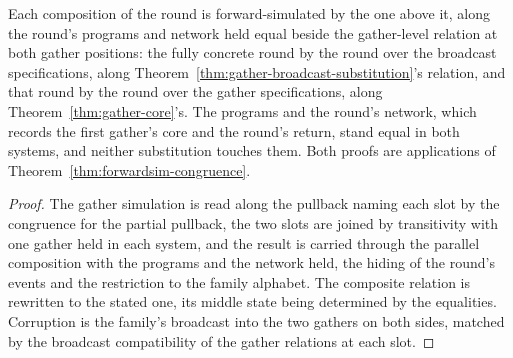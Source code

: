\begin{theorem}
  \label{thm:gbca-round-substitutions}
  \leanok
  Each composition of the round is forward-simulated by the one above it, along the round's programs and network held equal beside the gather-level relation at both gather positions: the fully concrete round by the round over the broadcast specifications, along Theorem~\ref{thm:gather-broadcast-substitution}'s relation, and that round by the round over the gather specifications, along Theorem~\ref{thm:gather-core}'s.
  The programs and the round's network, which records the first gather's core and the round's return, stand equal in both systems, and neither substitution touches them.
  Both proofs are applications of Theorem~\ref{thm:forwardsim-congruence}.
\end{theorem}

\begin{proof}\leanok
  The gather simulation is read along the pullback naming each slot by the congruence for the partial pullback, the two slots are joined by transitivity with one gather held in each system, and the result is carried through the parallel composition with the programs and the network held, the hiding of the round's events and the restriction to the family alphabet.
  The composite relation is rewritten to the stated one, its middle state being determined by the equalities.
  Corruption is the family's broadcast into the two gathers on both sides, matched by the broadcast compatibility of the gather relations at each slot.
\end{proof}
